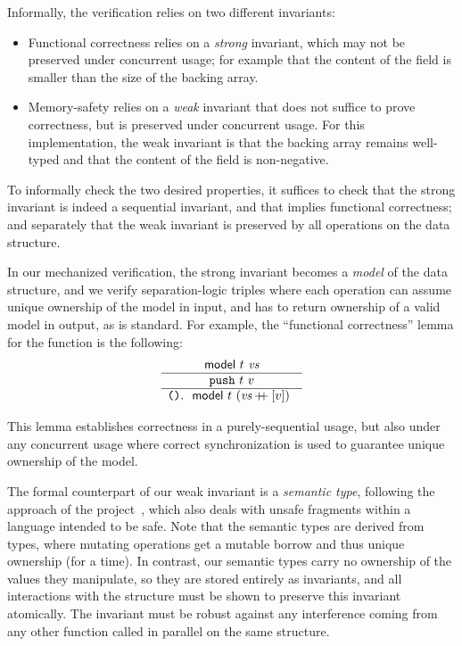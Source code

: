 Informally, the verification relies on two different invariants:
\begin{itemize}
\item Functional correctness relies on a \emph{strong} invariant,
  which may not be preserved under concurrent usage; for example that
  the content of the  field is smaller than the
  size of the backing array.
\item Memory-safety relies on a \emph{weak} invariant that does not
  suffice to prove correctness, but is preserved under concurrent
  usage. For this  implementation, the weak
  invariant is that the backing array remains well-typed and that the
  content of the  field is non-negative.
\end{itemize}
To informally check the two desired properties, it suffices to check
that the strong invariant is indeed a sequential invariant, and that
implies functional correctness; and separately that the weak invariant
is preserved by all operations on the data structure.

In our mechanized verification, the strong invariant becomes a \emph{model}
of the data structure, and we verify separation-logic triples where
each operation can assume unique ownership of the model in input, and
has to return ownership of a valid model in output, as is
standard. For example, the ``functional correctness'' lemma for the
 function is the following:
\[
  \begin{array}{c} \begin{array}{c} 
    \textsf{\upshape model}\ t\ \textit{vs}
   \end{array} \\ \hline 
    \texttt{push}\ t\ v
   \\ \hline 
    \texttt{()}
   \ldotp \begin{array}[t]{c} 
    \textsf{\upshape model}\ t\ (\textit{vs} \mathbin{+\mkern-7mu+} [v])
   \end{array} \end{array}
\]

This lemma establishes correctness in a purely-sequential usage, but
also under any concurrent usage where correct synchronization is used to
guarantee unique ownership of the model.

The formal counterpart of our weak invariant is a \emph{semantic type}, following the approach of the \RustBelt project~\citep*{DBLP:journals/pacmpl/0002JKD18}, which also deals with unsafe fragments within a language intended to be safe. Note that the \RustBelt semantic types are derived from \Rust types, where mutating operations get a mutable borrow and thus unique ownership (for a time). In contrast, our semantic types carry no ownership of the values they manipulate, so they are stored entirely as invariants, and all interactions with the structure must be shown to preserve this invariant atomically. The invariant must be robust against any interference coming from any other function called in parallel on the same structure.

